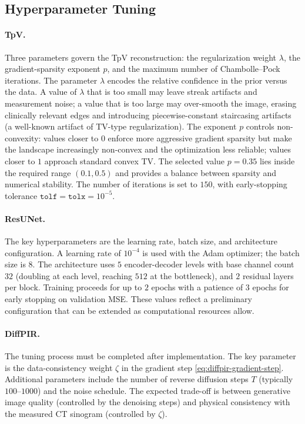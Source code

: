 \documentclass[11pt,a4paper]{article}
\begin{document}
\subsection{Hyperparameter Tuning}

\paragraph{TpV.}
Three parameters govern the TpV reconstruction: the regularization weight
$\lambda$, the gradient-sparsity exponent $p$, and the maximum number of
Chambolle--Pock iterations. The parameter $\lambda$ encodes the relative
confidence in the prior versus the data. A value of $\lambda$ that is too small
may leave streak artifacts and measurement noise; a value that is too large may
over-smooth the image, erasing clinically relevant edges and introducing
piecewise-constant staircasing artifacts (a well-known artifact of TV-type
regularization). The exponent $p$ controls non-convexity: values closer to $0$
enforce more aggressive gradient sparsity but make the landscape increasingly
non-convex and the optimization less reliable; values closer to $1$ approach
standard convex TV. The selected value $p=0.35$ lies inside the required range
$(0.1, 0.5)$ and provides a balance between sparsity and numerical stability.
The number of iterations is set to $150$, with early-stopping tolerance
$\texttt{tolf}=\texttt{tolx}=10^{-5}$.

\paragraph{ResUNet.}
The key hyperparameters are the learning rate, batch size, and architecture
configuration. A learning rate of $10^{-4}$ is used with the Adam optimizer;
the batch size is 8. The architecture uses $5$ encoder-decoder levels with base
channel count $32$ (doubling at each level, reaching $512$ at the bottleneck),
and $2$ residual layers per block. Training proceeds for up to $2$ epochs with
a patience of $3$ epochs for early stopping on validation MSE. These values
reflect a preliminary configuration that can be extended as computational
resources allow.

\paragraph{DiffPIR.}
The tuning process must be completed after implementation. The key parameter is
the data-consistency weight $\zeta$ in the gradient step
\eqref{eq:diffpir-gradient-step}. Additional parameters include the number of
reverse diffusion steps $T$ (typically $100$--$1000$) and the noise schedule.
The expected trade-off is between generative image quality (controlled by the
denoising steps) and physical consistency with the measured CT sinogram
(controlled by $\zeta$).
\end{document}
